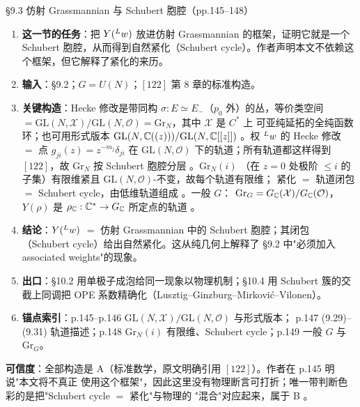\begin{kcard}{\S9.3 仿射 Grassmannian 与 Schubert 胞腔（pp.145--148）}
\begin{enumerate}[label=\textbf{\arabic*}]
\item \textbf{这一节的任务}：把 $Y({}^{L}w)$ 放进仿射 Grassmannian 的框架，证明它就是一个 Schubert
  胞腔，从而得到自然紧化（Schubert cycle）。作者声明本文不依赖这个框架，但它解释了紧化的来历。
\item \textbf{输入}：\S9.2；$G=U(N)$；$[122]$ 第 8 章的标准构造。
\item \textbf{关键构造}：Hecke 修改是带同构 $\sigma:E\simeq E_-$（$p_0$ 外）的丛，等价类空间
  $=\mathrm{GL}(N,\mathcal X)/\mathrm{GL}(N,\mathcal O)=\mathrm{Gr}_N$，其中 $\mathcal X$ 是 $C^*$ 上
  可亚纯延拓的全纯函数环；也可用形式版本 $\mathrm{GL}(N,\mathbb{C}((z)))/\mathrm{GL}(N,\mathbb{C}[[z]])$
  \pA{}。权 ${}^{L}w$ 的 Hecke 修改 $=$ 点
  $g_{ji}(z)=z^{-m_j}\delta_{ji}$ 在 $\mathrm{GL}(N,\mathcal O)$ 下的轨道；所有轨道都这样得到
  $[122]$，故 $\mathrm{Gr}_N$ 按 Schubert 胞腔分层 \pA{}。$\mathrm{Gr}_N(i)$
  （在 $z=0$ 处极阶 $\le i$ 的子集）有限维紧且 $\mathrm{GL}(N,\mathcal O)$-不变，故每个轨道有限维；
  紧化 $=$ 轨道闭包 $=$ Schubert cycle，由低维轨道组成 \pA{}。一般 $G$：
  $\mathrm{Gr}_G=G_{\mathbb{C}}(\mathcal X)/G_{\mathbb{C}}(\mathcal O)$，$Y(\rho)$ 是 $\rho_{\mathbb{C}}:\mathbb{C}^*\to G_{\mathbb{C}}$
  所定点的轨道 \pA{}。
\item \textbf{结论}：$Y({}^{L}w)$ $=$ 仿射 Grassmannian 中的 Schubert 胞腔；其闭包（Schubert
  cycle）给出自然紧化。这从纯几何上解释了 \S9.2 中"必须加入 associated weights"的现象。
\item \textbf{出口}：\S10.2 用单极子成泡给同一现象以物理机制；\S10.4 用 Schubert 簇的交截上同调把
  OPE 系数精确化（Lusztig--Ginzburg--Mirkovi\'c--Vilonen）。
\item \textbf{锚点索引}：p.145--p.146 $\mathrm{GL}(N,\mathcal X)/\mathrm{GL}(N,\mathcal O)$ 与形式版本；
  p.147 (9.29)--(9.31) 轨道描述；p.148 $\mathrm{Gr}_N(i)$ 有限维、Schubert cycle；p.149 一般 $G$ 与
  $\mathrm{Gr}_G$。
\end{enumerate}
\textbf{可信度}：全部构造是 A（标准数学，原文明确引用 $[122]$）。作者在 p.145 明说"本文将不真正
使用这个框架"，因此这里没有物理断言可打折；唯一带判断色彩的是把"Schubert cycle $=$ 紧化"与物理的
"混合"对应起来，属于 B \pB{}。
\end{kcard}

